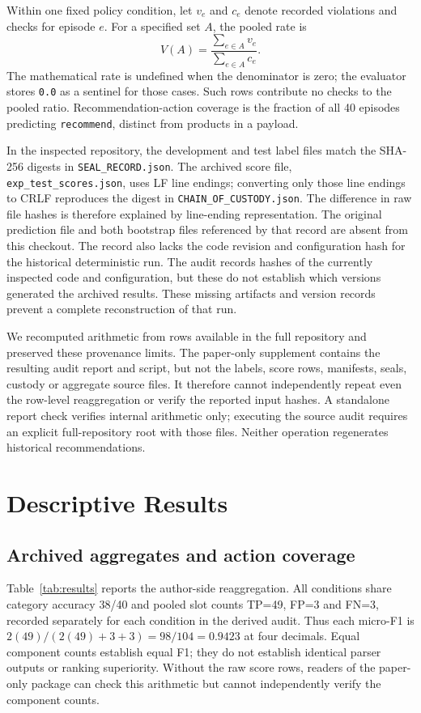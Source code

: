 \documentclass[conference,a4paper]{IEEEtran}
\newcommand{\code}[1]{\texttt{#1}}
\begin{document}
Within one fixed policy condition, let $v_e$ and $c_e$ denote recorded violations and checks for episode $e$. For a specified set $A$, the pooled rate is
\begin{equation}
V(A)=\frac{\sum_{e\in A}v_e}{\sum_{e\in A}c_e}.\label{eq:metric}
\end{equation}
The mathematical rate is undefined when the denominator is zero; the evaluator stores \code{0.0} as a sentinel for those cases. Such rows contribute no checks to the pooled ratio. Recommendation-action coverage is the fraction of all 40 episodes predicting \code{recommend}, distinct from products in a payload.

In the inspected repository, the development and test label files match the SHA-256 digests in \code{SEAL\_RECORD.json}. The archived score file, \code{exp\_test\_scores.json}, uses LF line endings; converting only those line endings to CRLF reproduces the digest in \code{CHAIN\_OF\_CUSTODY.json}. The difference in raw file hashes is therefore explained by line-ending representation. The original prediction file and both bootstrap files referenced by that record are absent from this checkout. The record also lacks the code revision and configuration hash for the historical deterministic run. The audit records hashes of the currently inspected code and configuration, but these do not establish which versions generated the archived results. These missing artifacts and version records prevent a complete reconstruction of that run.

We recomputed arithmetic from rows available in the full repository and preserved these provenance limits. The paper-only supplement contains the resulting audit report and script, but not the labels, score rows, manifests, seals, custody or aggregate source files. It therefore cannot independently repeat even the row-level reaggregation or verify the reported input hashes. A standalone report check verifies internal arithmetic only; executing the source audit requires an explicit full-repository root with those files. Neither operation regenerates historical recommendations.

\section{Descriptive Results}
\subsection{Archived aggregates and action coverage}
Table~\ref{tab:results} reports the author-side reaggregation. All conditions share category accuracy 38/40 and pooled slot counts TP=49, FP=3 and FN=3, recorded separately for each condition in the derived audit. Thus each micro-F1 is $2(49)/(2(49)+3+3)=98/104=0.9423$ at four decimals. Equal component counts establish equal F1; they do not establish identical parser outputs or ranking superiority. Without the raw score rows, readers of the paper-only package can check this arithmetic but cannot independently verify the component counts.
\end{document}
